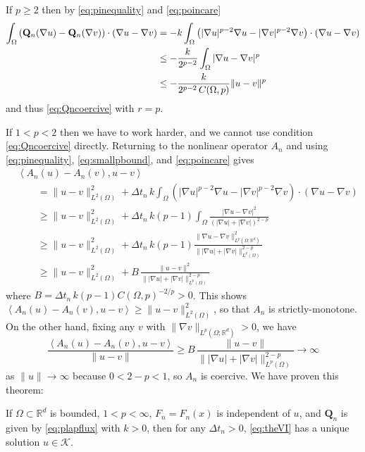 \documentclass[final,leqno,onefignum,onetabnum]{siamltex1213bueler}
\newcommand\bQ{\mathbf{Q}}
\renewcommand{\grad}{\nabla}
\newcommand{\ip}[2]{\ensuremath{\left<#1,#2\right>}}
\newcommand\RR{\mathbb{R}}
\begin{document}
If $p\ge 2$ then by \eqref{eq:pinequality} and \eqref{eq:poincare}
\begin{align}
\int_\Omega \left(\bQ_n(\grad u) - \bQ_n(\grad v)\right)\cdot (\grad u - \grad v) &= -k  \int_\Omega \left(|\grad u|^{p-2} \grad u - |\grad v|^{p-2} \grad v\right)\cdot (\grad u - \grad v) \notag \\
  &\le - \frac{k}{2^{p-2}} \int_\Omega |\grad u - \grad v|^p \notag \\
  &\le - \frac{k}{2^{p-2}\,C(\Omega,p)} \|u-v\|^p \label{eq:plapQnmono}
\end{align}
and thus \eqref{eq:Qncoercive} with $r=p$.

If $1<p<2$ then we have to work harder, and we cannot use condition \eqref{eq:Qncoercive} directly.  Returning to the nonlinear operator $A_n$ and using \eqref{eq:pinequality}, \eqref{eq:smallpbound}, and \eqref{eq:poincare} gives
\begin{align*}
  &\ip{A_n(u) - A_n(v)}{u-v} \\
  &\qquad = \|u-v\|_{L^2(\Omega)}^2 + \Delta t_n\,k \int_\Omega \left(|\grad u|^{p-2} \grad u - |\grad v|^{p-2} \grad v\right)\cdot (\grad u - \grad v) \\
  &\qquad \ge \|u-v\|_{L^2(\Omega)}^2 + \Delta t_n\,k (p-1) \int_\Omega \frac{|\grad u - \grad v|^2}{\left(|\grad u|+|\grad v|\right)^{2-p}} \\
  &\qquad \ge \|u-v\|_{L^2(\Omega)}^2 + \Delta t_n\,k (p-1) \frac{\|\grad u - \grad v\|_{L^p(\Omega; \RR^d)}^2}{\big\||\grad u|+|\grad v|\big\|_{L^p(\Omega)}^{2-p}} \\
  &\qquad \ge \|u-v\|_{L^2(\Omega)}^2 + B\, \frac{\|u - v\|^2}{\big\||\grad u|+|\grad v|\big\|_{L^p(\Omega)}^{2-p}}
\end{align*}
where $B = \Delta t_n\,k (p-1) C(\Omega,p)^{-2/p} >0$.  This shows $\ip{A_n(u) - A_n(v)}{u-v} \ge \|u-v\|_{L^2(\Omega)}^2$, so that $A_n$ is strictly-monotone.  On the other hand, fixing any $v$ with $\|\grad v\|_{L^p(\Omega;\RR^d)} >0$, we have
\begin{equation*}
\frac{\ip{A_n(u) - A_n(v)}{u-v}}{\|u-v\|} \ge B\, \frac{\|u - v\|}{\big\||\grad u|+|\grad v|\big\|_{L^p(\Omega)}^{2-p}} \to \infty
\end{equation*}
as $\|u\|\to\infty$ because $0<2-p<1$, so $A_n$ is coercive.  We have proven this theorem:

\medskip
\begin{theorem}  \label{thm:plapwellposed}  If $\Omega\subset \RR^d$ is bounded, $1<p<\infty$, $F_n=F_n(x)$ is independent of $u$, and $\bQ_n$ is given by \eqref{eq:plapflux} with $k>0$, then for any $\Delta t_n>0$, \eqref{eq:theVI} has a unique solution $u\in\mathcal{K}$.
\end{theorem}
\end{document}
